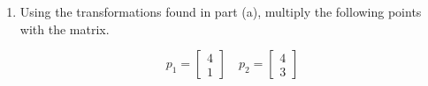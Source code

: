 \documentclass{article}
\begin{document}
\begin{enumerate}
\begin{enumerate}
                \begin{mdframed}
                    \begin{displaymath}
                        \begin{bmatrix}
                           x'\\ 
                           y'\\
                           z'
                        \end{bmatrix}
                        =
                        \begin{bmatrix}
                            1 & 0 & -7\\ 
                            0 & 1 & 5\\
                            0 & 0 & 1
                        \end{bmatrix}
                        \begin{bmatrix}
                            2 & 0 & 0\\ 
                            0 & -1 & 0\\
                            0 & 0 & 1
                        \end{bmatrix}
                        \begin{bmatrix}
                         x\\   
                         y\\
                         z
                        \end{bmatrix}
                    \end{displaymath}

                    Something to note is that I do this
                    in 2 steps. First I scale and reflect
                    the triangle, then I translate it into
                    position. I also do not forget that scaling
                    far from the origin causes the position to
                    shift.
                \end{mdframed}

            \item Using the transformations found in part (a), multiply the following points with
                the matrix.

                \begin{displaymath}
                    p_1 = \begin{bmatrix}
                       4\\ 
                       1
                    \end{bmatrix}
                    \quad
                    p_2 =
                    \begin{bmatrix}
                       4\\ 
                       3
                    \end{bmatrix}
                \end{displaymath}


\end{enumerate}
\end{enumerate}
\end{document}
